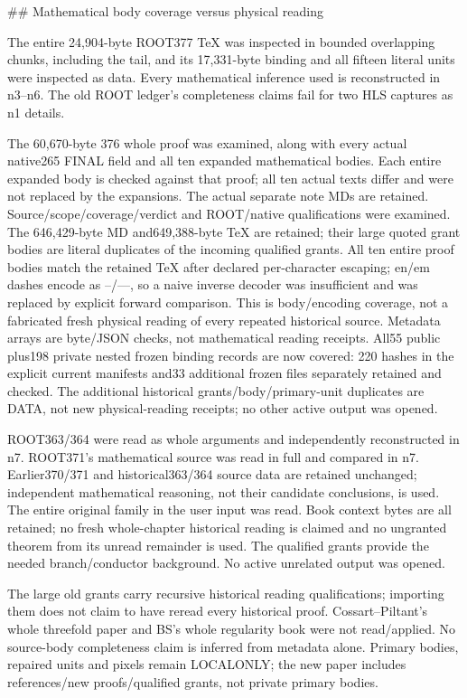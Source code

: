 \documentclass[11pt]{article}
\begin{document}
\begin{OwnProofBody}
## Mathematical body coverage versus physical reading

The entire 24,904-byte ROOT377 TeX was inspected in bounded overlapping chunks, including the tail, and its 17,331-byte binding and all fifteen literal units were inspected as data. Every mathematical inference used is reconstructed in n3--n6. The old ROOT ledger's completeness claims fail for two HLS captures as n1 details.

The 60,670-byte 376 whole proof was examined, along with every actual native265 FINAL field and all ten expanded mathematical bodies. Each entire expanded body is checked against that proof; all ten actual texts differ and were not replaced by the expansions. The actual separate note MDs are retained. Source/scope/coverage/verdict and ROOT/native qualifications were examined. The 646,429-byte MD and649,388-byte TeX are retained; their large quoted grant bodies are literal duplicates of the incoming qualified grants. All ten entire proof bodies match the retained TeX after declared per-character escaping; en/em dashes encode as --/---, so a naive inverse decoder was insufficient and was replaced by explicit forward comparison. This is body/encoding coverage, not a fabricated fresh physical reading of every repeated historical source. Metadata arrays are byte/JSON checks, not mathematical reading receipts. All55 public plus198 private nested frozen binding records are now covered: 220 hashes in the explicit current manifests and33 additional frozen files separately retained and checked. The additional historical grants/body/primary-unit duplicates are DATA, not new physical-reading receipts; no other active output was opened.

ROOT363/364 were read as whole arguments and independently reconstructed in n7. ROOT371's mathematical source was read in full and compared in n7. Earlier370/371 and historical363/364 source data are retained unchanged; independent mathematical reasoning, not their candidate conclusions, is used. The entire original family in the user input was read. Book context bytes are all retained; no fresh whole-chapter historical reading is claimed and no ungranted theorem from its unread remainder is used. The qualified grants provide the needed branch/conductor background. No active unrelated output was opened.

The large old grants carry recursive historical reading qualifications; importing them does not claim to have reread every historical proof. Cossart--Piltant's whole threefold paper and BS's whole regularity book were not read/applied. No source-body completeness claim is inferred from metadata alone. Primary bodies, repaired units and pixels remain LOCALONLY; the new paper includes references/new proofs/qualified grants, not private primary bodies.


\end{OwnProofBody}
\end{document}
